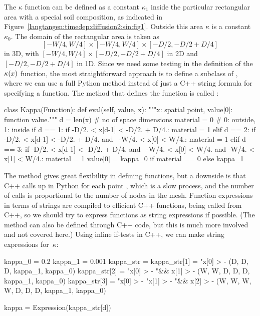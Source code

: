 The $\kappa$ function can be defined as a constant $\kappa_1$ inside
the particular rectangular area with a special soil composition, as
indicated in Figure~\ref{langtangen:timedep:diffusion2:sin:fig1}. Outside
this area $\kappa$ is a constant $\kappa_0$.
The domain of the rectangular area is taken as
\[ [-W/4, W/4]\times [-W/4, W/4]\times [-D/2, -D/2 + D/4]\]
in 3D, with $[-W/4, W/4]\times [-D/2, -D/2 + D/4]$ in 2D and
$[-D/2, -D/2 + D/4]$ in 1D.
Since we need some testing in the definition of the $\kappa({x})$
function, the most straightforward approach is to define a subclass
of , where we can use a full Python method instead of
just a C++ string formula for specifying a function.
The method that defines the function is called :
\begin{python}
class Kappa(Function):
    def eval(self, value, x):
        """x: spatial point, value[0]: function value."""
        d = len(x)  # no of space dimensions
        material = 0  # 0: outside, 1: inside
        if d == 1:
            if -D/2. < x[d-1] < -D/2. + D/4.:
                material = 1
        elif d == 2:
            if -D/2. < x[d-1] < -D/2. + D/4. and \
               -W/4. < x[0] < W/4.:
                material = 1
        elif d == 3:
            if -D/2. < x[d-1] < -D/2. + D/4. and \
               -W/4. < x[0] < W/4. and -W/4. < x[1] < W/4.:
                material = 1
        value[0] = kappa_0 if material == 0 else kappa_1
\end{python}
The  method gives great flexibility in defining functions, but a
downside is that C++ calls up \emp{eval} in Python for each point ,
which is a slow process, and the number of calls is proportional to the
number of nodes in the mesh.  Function expressions in terms of strings
are compiled to efficient C++ functions, being called from C++, so we
should try to express functions as string expressions if possible. (The
\emp{eval} method can also be defined through C++ code, but this is
much more involved and not covered here.)  Using inline if-tests in C++,
we can make string expressions for~$\kappa$:
\begin{python}
kappa_0 = 0.2
kappa_1 = 0.001
kappa_str = {}
kappa_str[1] = "x[0] > -%
               (D, D, D, kappa_1, kappa_0)
kappa_str[2] = "x[0] > -%
            "&& x[1] > -%
               (W, W, D, D, D, kappa_1, kappa_0)
kappa_str[3] = "x[0] > -%
               "x[1] > -%
            "&& x[2] > -%
               (W, W, W, W, D, D, D, kappa_1, kappa_0)

kappa = Expression(kappa_str[d])
\end{python}
